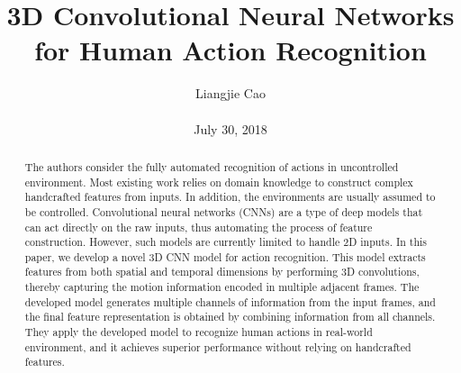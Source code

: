 \documentclass[10pt,twocolumn,letterpaper]{article}
\begin{document}
\title{\textbf{3D Convolutional Neural Networks for Human Action Recognition}}
\author{Liangjie Cao\\\\ July 30, 2018}
\maketitle
\begin{abstract}
The authors consider the fully automated recognition of actions in uncontrolled environment. Most existing work relies on domain knowledge to construct complex handcrafted features from inputs. In addition, the environments are usually assumed to be controlled. Convolutional neural networks (CNNs) are a type of deep models that can act directly on the raw inputs, thus automating the process of feature construction. However, such models are currently limited to handle 2D inputs. In this paper, we develop a novel 3D CNN model for
action recognition. This model extracts features from both spatial and temporal dimensions by performing 3D convolutions, thereby
capturing the motion information encoded in multiple adjacent frames. The developed model generates multiple channels of information from the input frames, and the final feature representation is obtained by combining information from all channels. They apply the developed model to recognize human actions in real-world environment, and
it achieves superior performance without relying on handcrafted features.
\end{abstract}
\end{document}
